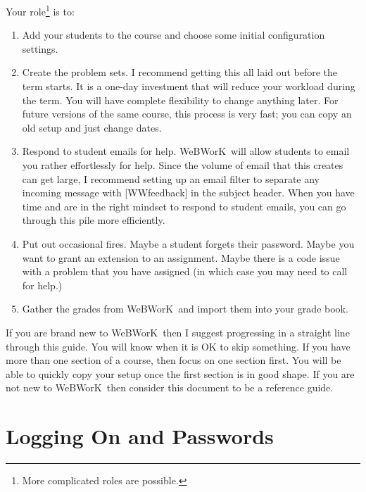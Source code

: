 \documentclass[12pt]{article}
\newcommand{\WW}{WeBWorK}
\begin{document}
Your role\footnote{More complicated roles are possible.} is to:
\begin{enumerate}
\item Add your students to the course and choose some initial configuration settings.
\item Create the problem sets. I recommend getting this all laid out before the term starts. It is a one-day investment that will reduce your workload during the term. You will have complete flexibility to change anything later. For future versions of the same course, this process is very fast; you can copy an old setup and just change dates.
\item Respond to student emails for help.  \WW\ will allow students to email you rather effortlessly for help. Since the volume of email that this creates can get large, I recommend setting up an email filter to separate any incoming message with [WWfeedback] in the subject header. When you have time and are in the right mindset to respond to student emails, you can go through this pile more efficiently.
\item Put out occasional fires. Maybe a student forgets their password. Maybe you want to grant an extension to an assignment. Maybe there is a code issue with a problem that you have assigned (in which case you may need to call for help.)
\item Gather the grades from \WW\ and import them into your grade book.
\end{enumerate}

If you are brand new to \WW\, then I suggest progressing in a straight line through this guide. You will know when it is OK to skip something. If you have more than one section of a course, then focus on one section first. You will be able to quickly copy your setup once the first section is in good shape. If you are not new to \WW\, then consider this document to be a reference guide.

\section{Logging On and Passwords}
\end{document}
